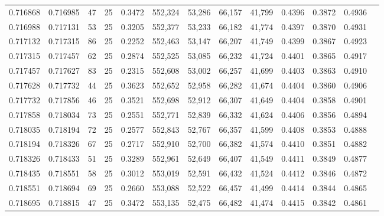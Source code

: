 \begin{tabular}{rrrrrrrrrrrrr}
0.716868 & 0.716985 &    47 &  25 &                                     0.3472 & 552,324 &  53,286 &  66,157 &  41,799 & 0.4396 & 0.3872 & 0.4936 \\
0.716988 & 0.717131 &    53 &  25 &                                     0.3205 & 552,377 &  53,233 &  66,182 &  41,774 & 0.4397 & 0.3870 & 0.4931 \\
0.717132 & 0.717315 &    86 &  25 &                                     0.2252 & 552,463 &  53,147 &  66,207 &  41,749 & 0.4399 & 0.3867 & 0.4923 \\
0.717315 & 0.717457 &    62 &  25 &                                     0.2874 & 552,525 &  53,085 &  66,232 &  41,724 & 0.4401 & 0.3865 & 0.4917 \\
0.717457 & 0.717627 &    83 &  25 &                                     0.2315 & 552,608 &  53,002 &  66,257 &  41,699 & 0.4403 & 0.3863 & 0.4910 \\
0.717628 & 0.717732 &    44 &  25 &                                     0.3623 & 552,652 &  52,958 &  66,282 &  41,674 & 0.4404 & 0.3860 & 0.4906 \\
0.717732 & 0.717856 &    46 &  25 &                                     0.3521 & 552,698 &  52,912 &  66,307 &  41,649 & 0.4404 & 0.3858 & 0.4901 \\
0.717858 & 0.718034 &    73 &  25 &                                     0.2551 & 552,771 &  52,839 &  66,332 &  41,624 & 0.4406 & 0.3856 & 0.4894 \\
0.718035 & 0.718194 &    72 &  25 &                                     0.2577 & 552,843 &  52,767 &  66,357 &  41,599 & 0.4408 & 0.3853 & 0.4888 \\
0.718194 & 0.718326 &    67 &  25 &                                     0.2717 & 552,910 &  52,700 &  66,382 &  41,574 & 0.4410 & 0.3851 & 0.4882 \\
0.718326 & 0.718433 &    51 &  25 &                                     0.3289 & 552,961 &  52,649 &  66,407 &  41,549 & 0.4411 & 0.3849 & 0.4877 \\
0.718435 & 0.718551 &    58 &  25 &                                     0.3012 & 553,019 &  52,591 &  66,432 &  41,524 & 0.4412 & 0.3846 & 0.4872 \\
0.718551 & 0.718694 &    69 &  25 &                                     0.2660 & 553,088 &  52,522 &  66,457 &  41,499 & 0.4414 & 0.3844 & 0.4865 \\
0.718695 & 0.718815 &    47 &  25 &                                     0.3472 & 553,135 &  52,475 &  66,482 &  41,474 & 0.4415 & 0.3842 & 0.4861 \\

\end{tabular}
